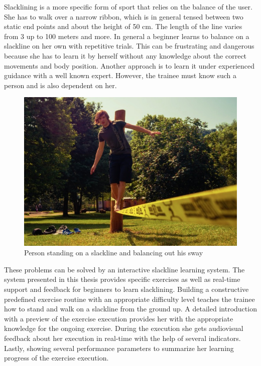 Slacklining is a more specific form of sport that relies on the balance of the user.
She has to walk over a narrow ribbon, which is in general tensed between two static end points and about the height of 50 cm.
The length of the line varies from 3 up to 100 meters and more.
In general a beginner learns to balance on a slackline on her own with repetitive trials.
This can be frustrating and dangerous because she has to learn it by herself without any knowledge about the correct movements and body position.
Another approach is to learn it under experienced guidance with a well known expert.
However, the trainee must know such a person and is also dependent on her.
\begin{figure}[htb]
	\centering
	\begin{minipage}[t]{1\linewidth}
		\centering
		\includegraphics[width=0.7\linewidth]{Pictures/1_slackline}
		\caption{Person standing on a slackline and balancing out his sway}
		\label{fig:1_slackline}
	\end{minipage}
\end{figure}

These problems can be solved by an interactive slackline learning system.
The system presented in this thesis provides specific exercises as well as real-time support and feedback for beginners to learn slacklining.
Building a constructive predefined exercise routine with an appropriate difficulty level teaches the trainee how to stand and walk on a slackline from the ground up.
A detailed introduction with a preview of the exercise execution provides her with the appropriate knowledge for the ongoing exercise.
During the execution she gets audiovisual feedback about her execution in real-time with the help of several indicators.
Lastly, showing several performance parameters to summarize her learning progress of the exercise execution.


